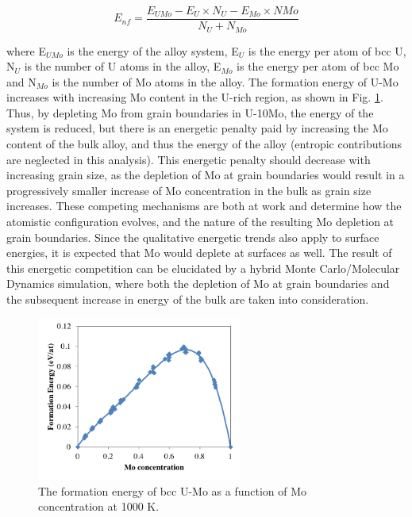 \documentclass[review]{elsarticle}
\begin{document}
\begin{equation}
\label{eqn:eform}
E_{nf}= \frac{ E_{UMo} - E_{U} \times N_{U} - E_{Mo} \times N{Mo} }{ N_{U} + N_{Mo} }
\end{equation}

where E$_{UMo}$ is the energy of the alloy system, E$_{U}$ is the energy per atom of bcc U, N$_{U}$ is the number of U atoms in the alloy, E$_{Mo}$ is the energy per atom of bcc Mo and N$_{Mo}$ is the number of Mo atoms in the alloy. The formation energy of U-Mo increases with increasing Mo content in the U-rich region, as shown in Fig. \ref{fig:umoform}. Thus, by depleting Mo from grain boundaries in U-10Mo, the energy of the system is reduced, but there is an energetic penalty paid by increasing the Mo content of the bulk alloy, and thus the energy of the alloy (entropic contributions are neglected in this analysis). This energetic penalty should decrease with increasing grain size, as the depletion of Mo at grain boundaries would result in a progressively smaller increase of Mo concentration in the bulk as grain size increases. These competing mechanisms are both at work and determine how the atomistic configuration evolves, and the nature of the resulting Mo depletion at grain boundaries. Since the qualitative energetic trends also apply to surface energies, it is expected that Mo would deplete at surfaces as well. The result of this energetic competition can be elucidated by a hybrid Monte Carlo/Molecular Dynamics simulation, where both the depletion of Mo at grain boundaries and the subsequent increase in energy of the bulk are taken into consideration.

\begin{figure}[h]
 \centering
 \includegraphics[width=0.6\textwidth]{umoform.png} 
 \caption{The formation energy of bcc U-Mo as a function of Mo concentration at 1000 K.}
 \label{fig:umoform}
\end{figure}
\end{document}
